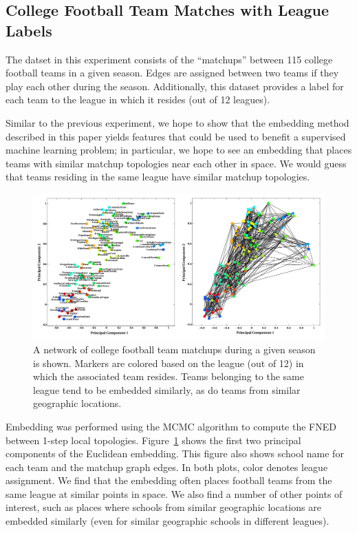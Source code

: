 \documentclass{article}
\begin{document}
\subsection{College Football Team Matches with League Labels}

The datset in this experiment consists of the ``matchups'' between 115 college football teams \cite{newman2006finding} in a given season. Edges are assigned between two teams if they play each other during the season. Additionally, this dataset provides a label for each team to the league in which it resides (out of 12 leagues). 

Similar to the previous experiment, we hope to show that the embedding method described in this paper yields features that could be used to benefit a supervised machine learning problem; in particular, we hope to see an embedding that places teams with similar matchup topologies near each other in space. We would guess that teams residing in the same league have similar matchup topologies.

\begin{figure}[!]
  \centering               
  \includegraphics[width=1\textwidth]{../img/demo7_footballTeams/footballFigure.pdf}
  \caption{A network of college football team matchups during a given season is shown. Markers are colored based on the league (out of 12) in which the associated team resides. Teams belonging to the same league tend to be embedded similarly, as do teams from similar geographic locations.}
  \label{fig:footballTeams}
\end{figure}

Embedding was performed using the MCMC algorithm to compute the FNED between 1-step local topologies. Figure~\ref{fig:footballTeams} shows the first two principal components of the Euclidean embedding. This figure also shows school name for each team and the matchup graph edges. In both plots, color denotes league assignment. We find that the embedding often places football teams from the same league at similar points in space. We also find a number of other points of interest, such as places where schools from similar geographic locations are embedded similarly (even for similar geographic schools in different leagues).
\end{document}
